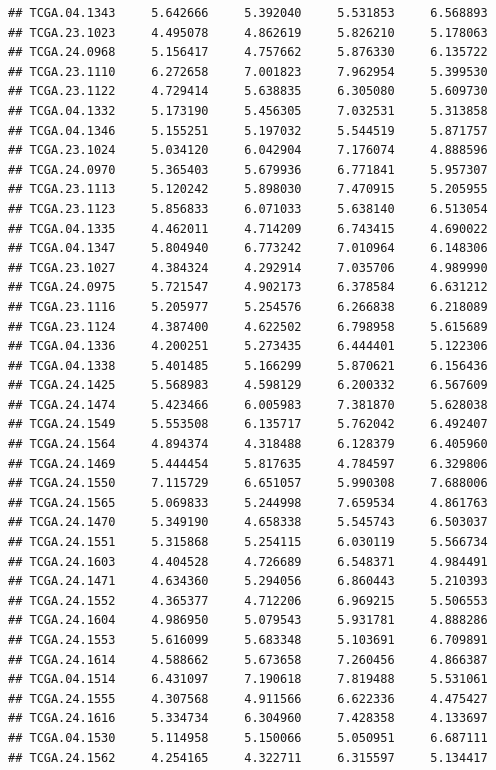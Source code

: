 \documentclass[UTF8]{beamer}\usepackage[]{graphicx}\usepackage[]{color}
\makeatletter
\newenvironment{kframe}{%
 \def\at@end@of@kframe{}%
 \ifinner\ifhmode%
  \def\at@end@of@kframe{\end{minipage}}%
  \begin{minipage}{\columnwidth}%
 \fi\fi%
 \def\FrameCommand##1{\hskip\@totalleftmargin \hskip-\fboxsep
 \colorbox{shadecolor}{##1}\hskip-\fboxsep
     \hskip-\linewidth \hskip-\@totalleftmargin \hskip\columnwidth}%
 \MakeFramed {\advance\hsize-\width
   \@totalleftmargin\z@ \linewidth\hsize
   \@setminipage}}%
 {\par\unskip\endMakeFramed%
 \at@end@of@kframe}
\newenvironment{knitrout}{}{} %
\makeatother
\begin{document}
\begin{frame}[fragile]
\begin{knitrout}
\begin{kframe}
\begin{verbatim}
## TCGA.04.1343     5.642666     5.392040     5.531853     6.568893
## TCGA.23.1023     4.495078     4.862619     5.826210     5.178063
## TCGA.24.0968     5.156417     4.757662     5.876330     6.135722
## TCGA.23.1110     6.272658     7.001823     7.962954     5.399530
## TCGA.23.1122     4.729414     5.638835     6.305080     5.609730
## TCGA.04.1332     5.173190     5.456305     7.032531     5.313858
## TCGA.04.1346     5.155251     5.197032     5.544519     5.871757
## TCGA.23.1024     5.034120     6.042904     7.176074     4.888596
## TCGA.24.0970     5.365403     5.679936     6.771841     5.957307
## TCGA.23.1113     5.120242     5.898030     7.470915     5.205955
## TCGA.23.1123     5.856833     6.071033     5.638140     6.513054
## TCGA.04.1335     4.462011     4.714209     6.743415     4.690022
## TCGA.04.1347     5.804940     6.773242     7.010964     6.148306
## TCGA.23.1027     4.384324     4.292914     7.035706     4.989990
## TCGA.24.0975     5.721547     4.902173     6.378584     6.631212
## TCGA.23.1116     5.205977     5.254576     6.266838     6.218089
## TCGA.23.1124     4.387400     4.622502     6.798958     5.615689
## TCGA.04.1336     4.200251     5.273435     6.444401     5.122306
## TCGA.04.1338     5.401485     5.166299     5.870621     6.156436
## TCGA.24.1425     5.568983     4.598129     6.200332     6.567609
## TCGA.24.1474     5.423466     6.005983     7.381870     5.628038
## TCGA.24.1549     5.553508     6.135717     5.762042     6.492407
## TCGA.24.1564     4.894374     4.318488     6.128379     6.405960
## TCGA.24.1469     5.444454     5.817635     4.784597     6.329806
## TCGA.24.1550     7.115729     6.651057     5.990308     7.688006
## TCGA.24.1565     5.069833     5.244998     7.659534     4.861763
## TCGA.24.1470     5.349190     4.658338     5.545743     6.503037
## TCGA.24.1551     5.315868     5.254115     6.030119     5.566734
## TCGA.24.1603     4.404528     4.726689     6.548371     4.984491
## TCGA.24.1471     4.634360     5.294056     6.860443     5.210393
## TCGA.24.1552     4.365377     4.712206     6.969215     5.506553
## TCGA.24.1604     4.986950     5.079543     5.931781     4.888286
## TCGA.24.1553     5.616099     5.683348     5.103691     6.709891
## TCGA.24.1614     4.588662     5.673658     7.260456     4.866387
## TCGA.04.1514     6.431097     7.190618     7.819488     5.531061
## TCGA.24.1555     4.307568     4.911566     6.622336     4.475427
## TCGA.24.1616     5.334734     6.304960     7.428358     4.133697
## TCGA.04.1530     5.114958     5.150066     5.050951     6.687111
## TCGA.24.1562     4.254165     4.322711     6.315597     5.134417

\end{verbatim}
\end{kframe}
\end{knitrout}
\end{frame}
\end{document}
